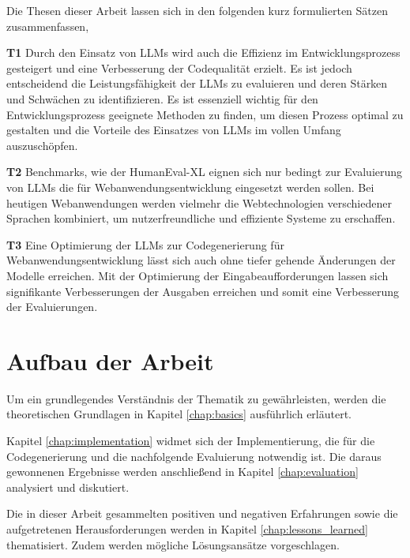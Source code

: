 Die Thesen dieser Arbeit lassen sich in den folgenden kurz formulierten Sätzen zusammenfassen,

\begin{myitemize}
	\item[\textbf{T1}] Durch den Einsatz von LLMs wird auch die Effizienz im Entwicklungsprozess gesteigert und eine Verbesserung der Codequalität erzielt. Es ist jedoch entscheidend die Leistungsfähigkeit der LLMs zu evaluieren und deren Stärken und Schwächen zu identifizieren. Es ist essenziell wichtig für den Entwicklungsprozess geeignete Methoden zu finden, um diesen Prozess optimal zu gestalten und die Vorteile des Einsatzes von LLMs im vollen Umfang auszuschöpfen.
	\item[\textbf{T2}] Benchmarks, wie der HumanEval-XL eignen sich nur bedingt zur Evaluierung von LLMs die für Webanwendungsentwicklung eingesetzt werden sollen. Bei heutigen Webanwendungen werden vielmehr die Webtechnologien verschiedener Sprachen kombiniert, um nutzerfreundliche und effiziente Systeme zu erschaffen.
	\item[\textbf{T3}] Eine Optimierung der LLMs zur Codegenerierung für Webanwendungsentwicklung lässt sich auch ohne tiefer gehende Änderungen der Modelle erreichen. Mit der Optimierung der Eingabeaufforderungen lassen sich signifikante Verbesserungen der Ausgaben erreichen und somit eine Verbesserung der Evaluierungen.
\end{myitemize}



\section{Aufbau der Arbeit}
Um ein grundlegendes Verständnis der Thematik zu gewährleisten, werden die theoretischen Grundlagen in Kapitel \ref{chap:basics} ausführlich erläutert.\vspace{0.2cm}

Kapitel \ref{chap:implementation} widmet sich der Implementierung, die für die Codegenerierung und die nachfolgende Evaluierung notwendig ist. Die daraus gewonnenen Ergebnisse werden anschließend in Kapitel \ref{chap:evaluation} analysiert und diskutiert.\vspace{0.2cm}

Die in dieser Arbeit gesammelten positiven und negativen Erfahrungen sowie die aufgetretenen Herausforderungen werden in Kapitel \ref{chap:lessons_learned} thematisiert. Zudem werden mögliche Lösungsansätze vorgeschlagen.\vspace{0.2cm}

